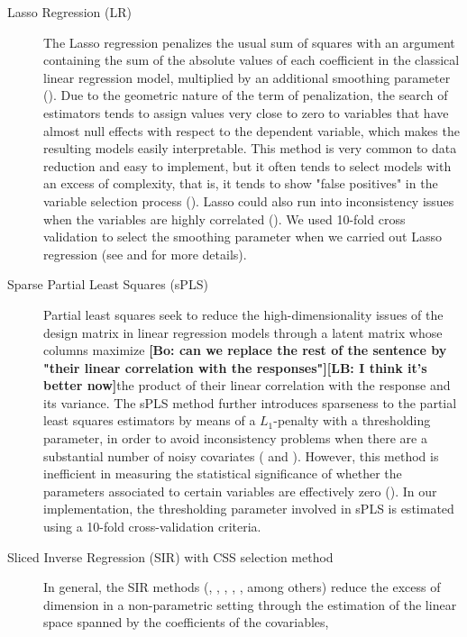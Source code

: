\documentclass[11pt]{amsart}
\theoremstyle{plain}
\theoremstyle{definition}
\theoremstyle{remark}
\newcommand{\bl}[1]{\color{ForestGreen}\textbf{[Bo: #1]}\normalcolor}
\newcommand{\lb}[1]{\color{MidnightBlue}\textbf{[LB: #1]}\normalcolor}
\begin{document}
\begin{description}
\item[Lasso Regression (LR)]
  The Lasso regression penalizes the usual sum of squares with an argument
 containing the sum of the absolute values of each coefficient in the classical
 linear regression model, multiplied by an additional smoothing parameter  (\cite{Tibshirani1996}). Due
 to the geometric nature of the term of penalization, the search of estimators
 tends to assign values very close to zero to variables that have almost null
 effects with respect to the dependent variable, which makes the resulting
 models easily interpretable. This method is very common to data reduction and easy to implement, but it often tends to select models with an excess of complexity, that is,
 it tends to show "false positives" in the variable selection process 
 (\cite{Fan2010}). Lasso could also run into inconsistency issues when the
 variables are highly correlated (\cite{Zou2005}).
 We used 10-fold cross validation to select the smoothing parameter when we carried out Lasso regression (see \cite{Tibshirani1996} and \cite{Friedman2010} for more details). 
\item[Sparse Partial Least Squares (sPLS)] 
  Partial least squares seek to reduce the high-dimensionality issues of the
  design matrix in  
  linear regression models through a latent matrix whose columns maximize
  \bl{can we replace the rest of the sentence by "their linear correlation with
    the responses"}\lb{I think it's better now}the 
  product of their linear correlation with the response and its
  variance. The sPLS method further introduces sparseness to the partial least squares
  estimators by means of a $L_1$-penalty with a thresholding parameter, in order to avoid inconsistency problems when there are a
  substantial number of noisy covariates (\cite{Chun2010} and
  \cite{Chung2013}). However, this method is inefficient in
  measuring the statistical significance of whether the parameters associated to certain
  variables are effectively zero (\cite{OlsonHunt2014}). In our implementation, the
  thresholding parameter involved in sPLS is estimated using a 10-fold cross-validation criteria.    
\item[Sliced Inverse Regression (SIR) with CSS selection method]
  In general, the SIR methods (\cite{Li1991},
  \cite{Duan1991}, \cite{Zhong2005}, \cite{Li2008}, \cite{Coudret2014}, \cite{Weisberg2002} among
  others) reduce the excess of dimension in a non-parametric setting through the
  estimation of the linear space spanned by the coefficients of the covariables,

\end{description}
\end{document}
